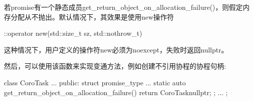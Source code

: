 若promise有一个静态成员get\_return\_object\_on\_allocation\_failure()，则假定内存分配从不抛出。默认情况下，其效果是使用new操作符

\begin{cpp}
::operator new(std::size_t sz, std::nothrow_t)
\end{cpp}

这种情况下，用户定义的操作符new必须为noexcept，失败时返回nullptr。

然后，可以使用该函数来实现变通方法，例如创建不引用协程的协程句柄:

\begin{cpp}
class CoroTask {
	...
	public:
	struct promise_type {
		...
		static auto get_return_object_on_allocation_failure() {
			return CoroTask{nullptr};
		}
	};
	...
};
\end{cpp}





























